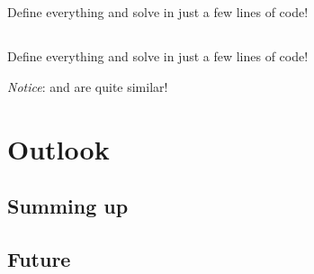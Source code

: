 \documentclass[10pt,utf8,compress,xcolor=dvipsnames]{beamer}
\begin{document}
\subsection{\PY}
\begin{frame}[fragile]{\insertsubsectionhead}
	Define everything and solve in just a few lines of code!\\[0.0cm]
	\lstset{language = python}
	
	
\end{frame}
\subsection{\CPP}
\begin{frame}[fragile]{\insertsubsectionhead}
	Define everything and solve in just a few lines of code!\\[0.0cm]
	\lstset{language = c++}
	
	{\em Notice}: \CPP and \PY are quite similar!
\end{frame}

\section{Outlook}

\subsection{Summing up}
\begin{frame}[fragile]{\insertsubsectionhead}
\end{frame}

\subsection{Future}
\begin{frame}[fragile]{\insertsubsectionhead}
\end{frame}
\end{document}
